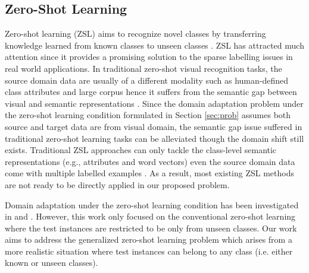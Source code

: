 \documentclass[conference]{IEEEtran}
\begin{document}
\subsection{Zero-Shot Learning} \label{sec:zsl}
Zero-shot learning (ZSL) aims to recognize novel classes by transferring knowledge learned from known classes to unseen classes \cite{wang2017zero}. ZSL has attracted much attention since it provides a promising solution to the sparse labelling issues in real world applications. In traditional zero-shot visual recognition tasks, the source domain data are usually of a different modality such as human-defined class attributes and large corpus hence it suffers from the semantic gap between visual and semantic representations \cite{wang2017zero}. Since the domain adaptation problem under the zero-shot learning condition formulated in Section \ref{sec:prob} assumes both source and target data are from visual domain, the semantic gap issue suffered in traditional zero-shot learning tasks can be alleviated though the domain shift still exists. Traditional ZSL approaches can only tackle the class-level semantic representations (e.g., attributes and word vectors) even the source domain data come with multiple labelled examples \cite{wang2017alternative}. As a result, most existing ZSL methods are not ready to be directly applied in our proposed problem.

Domain adaptation under the zero-shot learning condition has been investigated in \cite{saenko2010adapting} and \cite{tzeng2015simultaneous}. However, this work only focused on the conventional zero-shot learning \cite{xian2018zero} where the test instances are restricted to be only from unseen classes. Our work aims to address the generalized zero-shot learning problem \cite{xian2018zero} which arises from a more realistic situation where test instances can belong to any class (i.e. either known or unseen classes).
\end{document}
